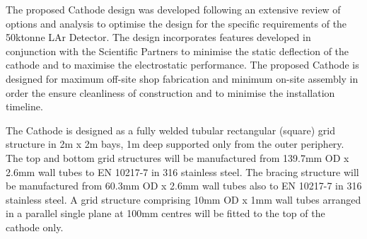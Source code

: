 The proposed Cathode design was developed following an extensive review of options and analysis to optimise the design for the specific requirements of the 50ktonne LAr Detector.  The design incorporates features developed in conjunction with the Scientific Partners to minimise the static deflection of the cathode and to maximise the electrostatic performance. The proposed Cathode is designed for maximum off-site shop fabrication and minimum on-site assembly in order the ensure cleanliness of construction and to minimise the installation timeline.

The Cathode is designed as a fully welded tubular rectangular (square) grid structure in 2m x 2m bays, 1m deep supported only from the outer periphery.  The top and bottom grid structures will be manufactured from 139.7mm OD x 2.6mm wall tubes to EN 10217-7 in 316 stainless steel.  The bracing structure will be manufactured from 60.3mm OD x 2.6mm wall tubes also to EN 10217-7 in 316 stainless steel.  A grid structure comprising 10mm OD x 1mm wall tubes arranged in a parallel single plane at 100mm centres will be fitted to the top of the cathode only.

